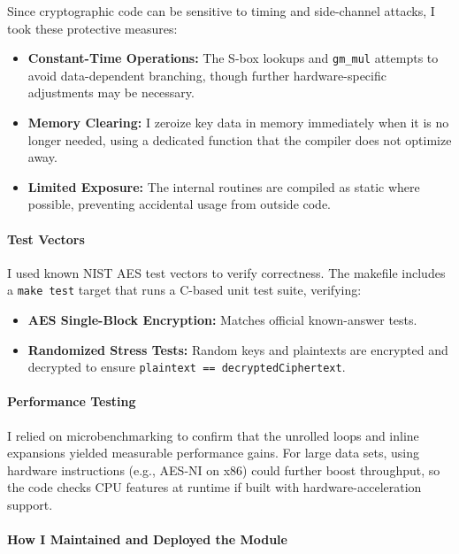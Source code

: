 Since cryptographic code can be sensitive to timing and side-channel attacks, I took these protective measures:

\begin{itemize}
	\item \textbf{Constant-Time Operations:} The S-box lookups and \texttt{gm\_mul} attempts to avoid data-dependent branching, though further hardware-specific adjustments may be necessary.
	\item \textbf{Memory Clearing:} I zeroize key data in memory immediately when it is no longer needed, using a dedicated function that the compiler does not optimize away.
	\item \textbf{Limited Exposure:} The internal routines are compiled as static where possible, preventing accidental usage from outside code.
\end{itemize}

\paragraph{Test Vectors}

I used known NIST AES test vectors to verify correctness. The makefile includes a \texttt{make test} target that runs a C-based unit test suite, verifying:

\begin{itemize}
	\item \textbf{AES Single-Block Encryption:} Matches official known-answer tests.
	\item \textbf{Randomized Stress Tests:} Random keys and plaintexts are encrypted and decrypted to ensure \texttt{plaintext == decryptedCiphertext}.
\end{itemize}

\paragraph{Performance Testing}
I relied on microbenchmarking to confirm that the unrolled loops and inline expansions yielded measurable performance gains. For large data sets, using hardware instructions (e.g., AES-NI on x86) could further boost throughput, so the code checks CPU features at runtime if built with hardware-acceleration support.

\paragraph{How I Maintained and Deployed the Module}

